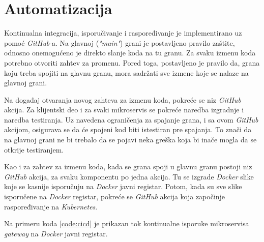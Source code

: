 \section{Automatizacija}
Kontinualna integracija, isporučivanje i raspoređivanje je implementirano uz 
pomoć \textit{GitHub}-a. Na glavnoj (\textit{"main"}) grani 
je postavljeno pravilo zaštite, odnosno onemogućeno je direkto slanje 
koda na tu granu. Za svaku izmenu koda potrebno otvoriti zahtev za 
promenu. Pored toga, postavljeno je pravilo da, grana koju treba spojiti 
na glavnu granu, mora sadržati sve izmene koje se nalaze na glavnoj grani.

Na događaj otvaranja novog zahteva za izmenu koda, pokreće se niz 
\textit{GitHub} akcija. Za klijentski deo i za svaki mikroservis 
se pokreće naredba izgradnje i naredba testiranja. Uz navedena 
ograničenja za spajanje grana, i sa ovom \textit{GitHub} akcijom, 
osigurava se da će spojeni kod biti istestiran pre spajanja. To znači da 
na glavnoj grani ne bi trebalo da se pojavi neka greška koja bi inače mogla 
da se otkrije testiranjem.

Kao i za zahtev za izmenu koda, kada se grana spoji u glavnu granu 
postoji niz \textit{GitHub} akcija, za svaku komponentu po jedna akcija.
Tu se izgrade \textit{Docker} slike koje se kasnije isporučuju na 
\textit{Docker} javni registar. Potom, kada su sve slike isporučene na 
\textit{Docker} registar, pokreće se \textit{GitHub} akcija koja započinje 
raspoređivanje na \textit{Kubernetes}.

Na primeru koda \ref{code:cicd} je prikazan tok kontinualne isporuke
mikroservisa \textit{gateway} na \textit{Docker} javni registar.

